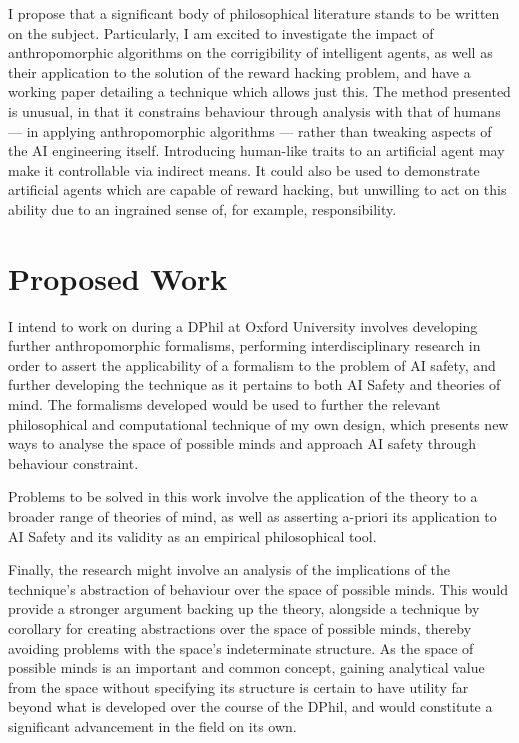 I propose that a significant body of philosophical literature stands to be written on the subject. Particularly, I am excited to investigate the impact of anthropomorphic algorithms on the corrigibility of intelligent agents, as well as their application to the solution of the reward hacking problem, and have a working paper detailing a technique which allows just this. The method presented is unusual, in that it constrains behaviour through analysis with that of humans --- in applying anthropomorphic algorithms --- rather than tweaking aspects of the AI engineering itself. Introducing human-like traits to an artificial agent may make it controllable via indirect means. It could also be used to demonstrate artificial agents which are capable of reward hacking, but unwilling to act on this ability due to an ingrained sense of, for example, responsibility.\par

\section{Proposed Work}
 I intend to work on during a DPhil at Oxford University involves developing further anthropomorphic formalisms, performing interdisciplinary research in order to assert the applicability of a formalism to the problem of AI safety, and further developing the technique as it pertains to both AI Safety and theories of mind. The formalisms developed would be used to further the relevant philosophical and computational technique of my own design, which presents new ways to analyse the space of possible minds and approach AI safety through behaviour constraint.\par

Problems to be solved in this work involve the application of the theory to a broader range of theories of mind, as well as asserting a-priori its application to AI Safety and its validity as an empirical philosophical tool.\par

Finally, the research might involve an analysis of the implications of the technique's abstraction of behaviour over the space of possible minds. This would provide a stronger argument backing up the theory, alongside a technique by corollary for creating abstractions over the space of possible minds, thereby avoiding problems with the space's indeterminate structure. As the space of possible minds is an important and common concept, gaining analytical value from the space without specifying its structure is certain to have utility far beyond what is developed over the course of the DPhil, and would constitute a significant advancement in the field on its own.\par

